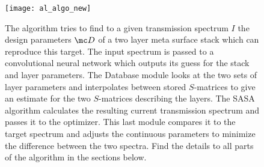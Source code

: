 \begin{figure}[H]
    \centering
    \texttt{[image: al\_algo\_new]}
    \caption[]{The algorithm tries to find to a given transmission spectrum $I$ the design parameters $\mc D$ of a two layer meta surface stack which can reproduce this target. The input spectrum is passed to a convolutional neural network which outputs its guess for the stack and layer parameters. The Database module looks at the two sets of layer parameters and interpolates between stored $S$-matrices to give an estimate for the two $S$-matrices describing the layers. The SASA algorithm calculates the resulting current transmission spectrum and passes it to the optimizer. This last module compares it to the target spectrum and adjusts the continuous parameters to minimize the difference between the two spectra. Find the details to all parts of the algorithm in the sections below.}
    \label{fig:al:algo}
\end{figure}
\vspace{0.2cm}

